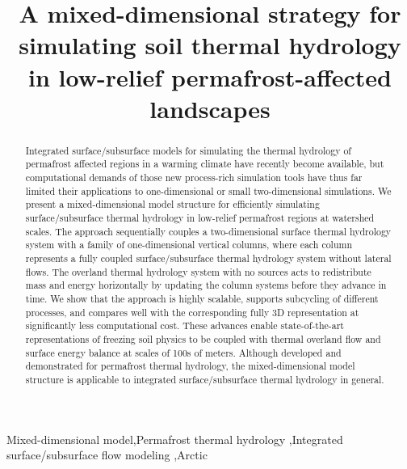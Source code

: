 \documentclass[review]{elsarticle}
\begin{document}
\begin{frontmatter}

\title{A mixed-dimensional strategy for simulating soil thermal hydrology in low-relief permafrost-affected landscapes}





\begin{abstract}
Integrated surface/subsurface models for simulating the thermal hydrology of permafrost affected regions in a warming climate have recently become available, but computational demands of those new process-rich simulation tools have thus far limited their applications to one-dimensional or small two-dimensional simulations. 
We present a mixed-dimensional model structure for efficiently simulating surface/subsurface thermal hydrology in low-relief permafrost regions at watershed scales. The approach sequentially couples a two-dimensional surface thermal hydrology system with a family of one-dimensional vertical columns, where each column represents a fully coupled surface/subsurface thermal hydrology system without lateral flows. The overland thermal hydrology system with no sources acts to redistribute mass and energy horizontally by updating the column systems before they advance in time. We show that the approach is highly scalable, supports subcycling of different processes, and compares well with the corresponding fully 3D representation at significantly less computational cost. These advances enable state-of-the-art representations of freezing soil physics to be coupled with thermal overland flow and surface energy balance at scales of 100s of meters. Although developed and demonstrated for permafrost thermal hydrology, the mixed-dimensional model structure is applicable to integrated surface/subsurface thermal hydrology in general. 
\end{abstract}

\begin{keyword}
Mixed-dimensional model\sep Permafrost thermal hydrology  \sep Integrated surface/subsurface flow modeling \sep Arctic 
\end{keyword}
\end{frontmatter}
\end{document}
